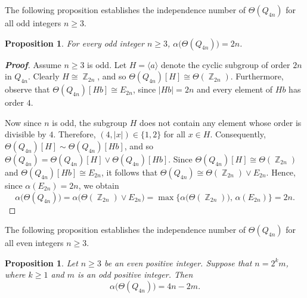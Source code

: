 \documentclass{amsart}
\theoremstyle{plain}
\newtheorem{proposition}[theorem]{Proposition}
\theoremstyle{definition}
\DeclareMathOperator{\Z}{\mathbb{Z}}
\begin{document}
The following proposition establishes the independence number of $\Theta(Q_{4n})$ for all odd integers $n\geq 3$.

\begin{proposition}
For every odd integer $n\geq 3$, $\alpha\bigl(\Theta(Q_{4n})\bigr)=2n$. 
\end{proposition}
\begin{proof}[\textbf{Proof}]
Assume $n\geq 3$ is odd. Let $H = \langle a \rangle$ denote the cyclic subgroup of order $2n$ in $Q_{4n}$. Clearly $H \cong \Z_{2n}$, and so $\Theta(Q_{4n})[H]\cong \Theta(\Z_{2n})$. Furthermore, observe that $\Theta(Q_{4n})[Hb]\cong E_{2n}$, since $|Hb| = 2n$ and every element of $Hb$ has order $4$. 

\vspace{0.4mm}
Now since $n$ is odd, the subgroup $H$ does not contain any element whose order is divisible by $4$. Therefore, $(4, |x|)\in \{1,2\}$ for all $x\in H$. Consequently, $\Theta(Q_{4n})[H]\sim \Theta(Q_{4n})[Hb]$, and so $\Theta(Q_{4n}) =  \Theta(Q_{4n})[H] \vee \Theta(Q_{4n})[Hb]$. Since $\Theta(Q_{4n})[H]\cong \Theta(\Z_{2n})$ and $\Theta(Q_{4n})[Hb]\cong E_{2n}$, it follows that $\Theta(Q_{4n}) \cong \Theta(\Z_{2n})\vee E_{2n}$. Hence, since $\alpha(E_{2n}) = 2n$, we obtain
\[\alpha\bigl(\Theta(Q_{4n})\bigr) = \alpha\bigl(\Theta(\Z_{2n})\vee E_{2n}\bigr) = \max\bigl\{\alpha\bigl(\Theta(\Z_{2n})\bigr),\, \alpha(E_{2n})\bigr\} = 2n.\]
\end{proof}


The following proposition establishes the independence number of $\Theta(Q_{4n})$ for all even integers $n\geq 3$.

\begin{proposition}
Let $n\geq 3$ be an even positive integer. Suppose that $n= 2^k m$, where $k\geq 1$ and $m$ is an odd positive integer. Then 
\[\alpha\bigl(\Theta(Q_{4n})\bigr)=4n-2m.\]
\end{proposition}
\end{document}
